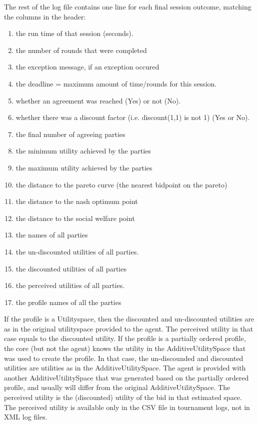 \documentclass[]{article}
\begin{document}
The rest of the log file contains one line for each final session outcome, matching the columns in the header:

\begin{enumerate}
\item the run time of that session (seconds). 
\item the number of rounds that were completed
\item the exception message, if an exception occured
\item the deadline = maximum amount of time/rounds for this session.
\item whether an agreement was reached (Yes) or not (No).
\item whether there was a discount factor (i.e. discount(1,1) is not 1) (Yes or No).
\item the final number of agreeing parties 
\item the minimum utility achieved by the parties
\item the maximum utility achieved by the parties
\item the distance to the pareto curve (the nearest bidpoint on the pareto)
\item the distance to the nash optimum point
\item the distance to the social welfare point
\item the names of all parties
\item the un-discounted utilities of all parties.
\item the discounted utilities of all parties
\item the perceived utilities of all parties. 
\item the profile names of all the parties
\end{enumerate}

If the profile is a Utilityspace, then the discounted and un-discounted utilities are as in the original utilityspace provided to the agent. The perceived utility in that case equals to the discounted utility. 
If the profile is a partially ordered profile, the core (but not the agent) knows the utility in the AdditiveUtilitySpace that was used to create the profile. In that case, the un-discounded and discounted utilities are utilities as in the AdditiveUtilitySpace. The agent is provided with another AdditiveUtilitySpace that was generated based on the partially ordered profile, and usually will differ from the original AdditiveUtilitySpace. The perceived utility is the (discounted) utility of the bid in that estimated space. 
The perceived utility is available only in the CSV file in tournament logs, not in XML log files.
\end{document}
